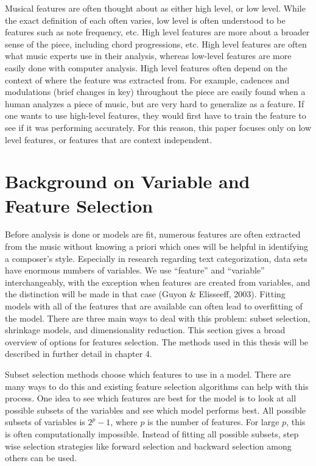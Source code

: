 \documentclass[12pt,twoside]{reedthesis}
\theoremstyle{definition}
\theoremstyle{definition}
\theoremstyle{definition}
\theoremstyle{remark}
\begin{document}
Musical features are often thought about as either high level, or low
level. While the exact definition of each often varies, low level is
often understood to be features such as note frequency, etc. High level
features are more about a broader sense of the piece, including chord
progressions, etc. High level features are often what music experts use
in their analysis, whereas low-level features are more easily done with
computer analysis. High level features often depend on the context of
where the feature was extracted from. For example, cadences and
modulations (brief changes in key) throughout the piece are easily found
when a human analyzes a piece of music, but are very hard to generalize
as a feature. If one wants to use high-level features, they would first
have to train the feature to see if it was performing accurately. For
this reason, this paper focuses only on low level features, or features
that are context independent.

\section{Background on Variable and Feature
Selection}\label{background-on-variable-and-feature-selection}

Before analysis is done or models are fit, numerous features are often
extracted from the music without knowing a priori which ones will be
helpful in identifying a composer's style. Especially in research
regarding text categorization, data sets have enormous numbers of
variables. We use ``feature'' and ``variable'' interchangeably, with the
exception when features are created from variables, and the distinction
will be made in that case (Guyon \& Elisseeff, 2003). Fitting models
with all of the features that are available can often lead to
overfitting of the model. There are three main ways to deal with this
problem: subset selection, shrinkage models, and dimensionality
reduction. This section gives a broad overview of options for features
selection. The methods used in this thesis will be described in further
detail in chapter 4.

Subset selection methods choose which features to use in a model. There
are many ways to do this and existing feature selection algorithms can
help with this process. One idea to see which features are best for the
model is to look at all possible subsets of the variables and see which
model performs best. All possible subsets of variables is \(2^p-1\),
where \(p\) is the number of features. For large \(p\), this is often
computationally impossible. Instead of fitting all possible subsets,
step wise selection strategies like forward selection and backward
selection among others can be used.
\end{document}
